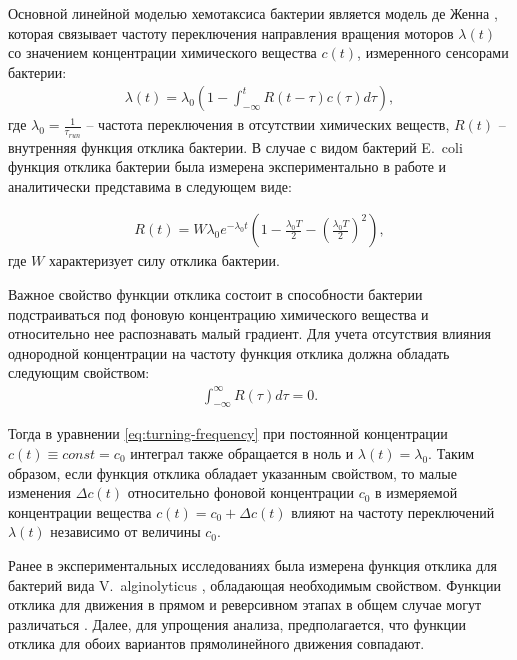 Основной линейной моделью хемотаксиса бактерии является модель де Женна \cite{de_gennes_chemotaxis_2004}, которая связывает частоту переключения направления вращения моторов $\lambda(t)$ со значением концентрации химического вещества $c(t)$, измеренного сенсорами бактерии:
\begin{equation}
    \begin{aligned}
        \lambda(t)=\lambda_0 \left ( 1 - \int_{-\infty}^t R(t-\tau)c(\tau)d\tau \right ),
    \label{eq:turning-frequency}
    \end{aligned}
\end{equation}
где $\lambda_0=\frac{1}{\tau_{run}}$ -- частота переключения в отсутствии химических веществ, $R(t)$ -- внутренняя функция отклика бактерии. В случае с видом бактерий E.~coli функция отклика бактерии была измерена экспериментально в работе \cite{block_adaptation_1983} и аналитически представима в следующем виде:

\begin{equation}
    \begin{aligned}
        R(t) = W \lambda_0 e^{-\lambda_0t} \left ( 1 - \frac{\lambda_0T}{2} - \left (\frac{\lambda_0T}{2}\right )^2 \right ),
    \label{eq:response-ecoli}
    \end{aligned}
\end{equation}
где $W$ характеризует силу отклика бактерии.  

Важное свойство функции отклика состоит в способности бактерии подстраиваться под фоновую концентрацию химического вещества и относительно нее распознавать малый градиент. Для учета отсутствия влияния однородной концентрации на частоту функция отклика должна обладать следующим свойством:  
\begin{equation}
    \begin{aligned}
        \int_{-\infty}^{\infty} R(\tau)d\tau = 0.
    \label{eq:response-ecoli-zero}
    \end{aligned}
\end{equation}

Тогда в уравнении \cref{eq:turning-frequency} при постоянной концентрации $c(t)\equiv const = c_0$ интеграл также обращается в ноль и $\lambda(t)=\lambda_0$. Таким образом, если функция отклика обладает указанным свойством, то малые изменения $\Delta c(t)$ относительно фоновой концентрации $c_0$ в измеряемой концентрации вещества $c(t)=c_0+\Delta c(t)$ влияют на частоту переключений $\lambda(t)$ независимо от величины $c_0$. 

Ранее в экспериментальных исследованиях была измерена функция отклика для бактерий вида V.~alginolyticus \cite{xie_element_2015}, обладающая необходимым свойством. Функции отклика для движения в прямом и реверсивном этапах в общем случае могут различаться \cite{xie_marine_2015}. Далее, для упрощения анализа, предполагается, что функции отклика для обоих вариантов прямолинейного движения совпадают.

